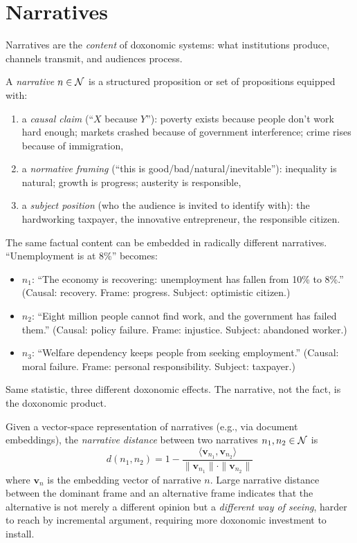 \section{Narratives}
\label{sec:ch4-narratives}

Narratives are the \emph{content} of doxonomic systems: what institutions produce, channels transmit, and audiences process.

\begin{definition}[Narrative]
\label{def:narrative}
A \emph{narrative} $n \in \mathcal{N}$ is a structured proposition or set of propositions equipped with:
\begin{enumerate}[nosep]
  \item a \emph{causal claim} (``$X$ because $Y$''): poverty exists because people don't work hard enough; markets crashed because of government interference; crime rises because of immigration,
  \item a \emph{normative framing} (``this is good/bad/natural/inevitable''): inequality is natural; growth is progress; austerity is responsible,
  \item a \emph{subject position} (who the audience is invited to identify with): the hardworking taxpayer, the innovative entrepreneur, the responsible citizen.
\end{enumerate}
\end{definition}

The same factual content can be embedded in radically different narratives.
``Unemployment is at 8\%'' becomes:
\begin{itemize}[nosep]
  \item $n_1$: ``The economy is recovering: unemployment has fallen from 10\% to 8\%.'' (Causal: recovery. Frame: progress. Subject: optimistic citizen.)
  \item $n_2$: ``Eight million people cannot find work, and the government has failed them.'' (Causal: policy failure. Frame: injustice. Subject: abandoned worker.)
  \item $n_3$: ``Welfare dependency keeps people from seeking employment.'' (Causal: moral failure. Frame: personal responsibility. Subject: taxpayer.)
\end{itemize}
Same statistic, three different doxonomic effects.
The narrative, not the fact, is the doxonomic product.

\begin{definition}
\label{def:narrative-distance}
Given a vector-space representation of narratives (e.g., via document embeddings), the \emph{narrative distance} between two narratives $n_1, n_2 \in \mathcal{N}$ is
\[
  d(n_1, n_2) = 1 - \frac{\langle \bm{v}_{n_1}, \bm{v}_{n_2} \rangle}{\|\bm{v}_{n_1}\| \cdot \|\bm{v}_{n_2}\|}
\]
where $\bm{v}_n$ is the embedding vector of narrative $n$.
Large narrative distance between the dominant frame and an alternative frame indicates that the alternative is not merely a different opinion but a \emph{different way of seeing}, harder to reach by incremental argument, requiring more doxonomic investment to install.
\end{definition}

